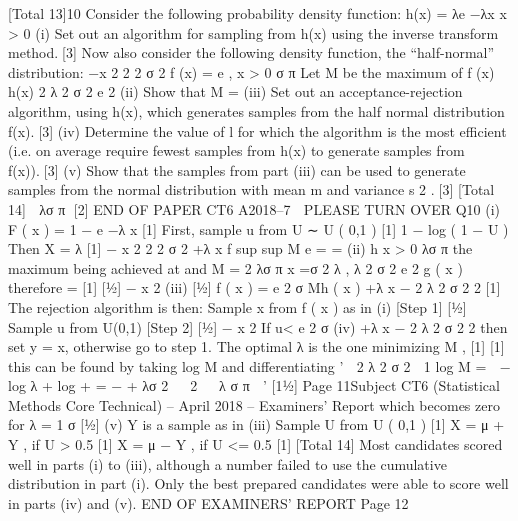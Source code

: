 [Total 13]10
Consider the following probability density function:
h(x) = λe −λx x > 0
(i)
Set out an algorithm for sampling from h(x) using the inverse transform
method.[3]
Now also consider the following density function, the “half-normal” distribution:
−x 2
2 2 σ 2
f (x) =
e
, x > 0
σ π
Let M be the maximum of
f (x)
h(x)
2
λ 2 σ 2
e 2
(ii) Show that M =
(iii) Set out an acceptance-rejection algorithm, using h(x), which generates samples
from the half normal distribution f(x).[3]
(iv) Determine the value of l for which the algorithm is the most efficient (i.e. on
average require fewest samples from h(x) to generate samples from f(x)).[3]
(v) Show that the samples from part (iii) can be used to generate samples from the
normal distribution with mean m and variance s 2 .[3]
[Total 14]

λσ π
[2]
END OF PAPER
CT6 A2018–7 
PLEASE TURN OVER
Q10
(i)
F ( x ) = 1 − e −λ x [1]
First, sample u from U ∼ U ( 0,1 ) [1]
1
− log ( 1 − U )
Then X =
λ [1]
− x 2
2 2 σ 2 +λ x
f
sup
sup
M
e
=
=
(ii)
h x > 0 λσ π
the maximum being achieved at
and M =
2
λσ π
x =σ 2 λ ,
λ 2 σ 2
e 2
g ( x )
therefore =
[1]
[1⁄2]
− x 2
(iii)
[1⁄2]
f ( x )
= e 2 σ
Mh ( x )
+λ x −
2
λ 2 σ 2
2
[1]
The rejection algorithm is then:
Sample x from f ( x ) as in (i) [Step 1] [1⁄2]
Sample u from U(0,1) [Step 2] [1⁄2]
− x 2
If u< e 2 σ
(iv)
+λ x −
2
λ 2 σ 2
2
then set y = x, otherwise go to step 1.
The optimal λ is the one minimizing M ,
[1]
[1]
this can be found by taking log M and differentiating
'

2 λ 2 σ 2 
1
log M =  − log λ + log
+
= − + λσ 2


2  
λ
σ π

'
[11⁄2]
Page 11Subject CT6 (Statistical Methods Core Technical) – April 2018 – Examiners’ Report
which becomes zero for λ =
1
σ
[1⁄2]
(v)
Y is a sample as in (iii)
Sample U from U ( 0,1 ) [1]
X = μ + Y , if U > 0.5 [1]
X = μ − Y , if U <= 0.5
[1]
[Total 14]
Most candidates scored well in parts (i) to (iii), although a number
failed to use the cumulative distribution in part (i).
Only the best prepared candidates were able to score well in parts (iv)
and (v).
END OF EXAMINERS’ REPORT
Page 12
